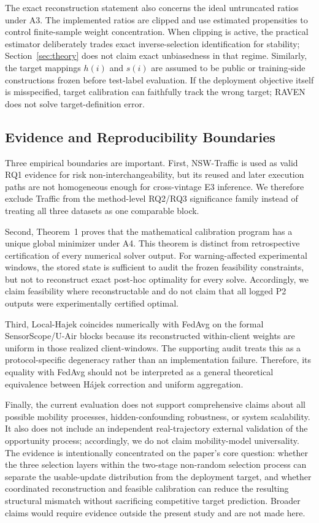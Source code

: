 \documentclass[letterpaper,journal]{IEEEtran}
\begin{document}
The exact reconstruction statement also concerns the ideal untruncated ratios
under A3.  The implemented ratios are clipped and use estimated propensities to
control finite-sample weight concentration.  When clipping is active, the
practical estimator deliberately trades exact inverse-selection identification
for stability; Section~\ref{sec:theory} does not claim exact unbiasedness in
that regime.  Similarly, the target mappings $h(i)$ and $s(i)$ are assumed to
be public or training-side constructions frozen before test-label evaluation.
If the deployment objective itself is misspecified, target calibration can
faithfully track the wrong target; RAVEN does not solve target-definition
error.

\subsection{Evidence and Reproducibility Boundaries}
\label{subsec:discussion_evidence_limits}

Three empirical boundaries are important.  First, NSW-Traffic is used as valid
RQ1 evidence for risk non-interchangeability, but its reused and later execution
paths are not homogeneous enough for cross-vintage E3 inference.  We therefore
exclude Traffic from the method-level RQ2/RQ3 significance family instead of
treating all three datasets as one comparable block.

Second, Theorem~1 proves that the mathematical calibration program has a unique
global minimizer under A4.  This theorem is distinct from retrospective
certification of every numerical solver output.  For warning-affected
experimental windows, the stored state is sufficient to audit the frozen
feasibility constraints, but not to reconstruct exact post-hoc optimality for
every solve.  Accordingly, we claim feasibility where reconstructable and do
not claim that all logged P2 outputs were experimentally certified optimal.

Third, Local-Hajek coincides numerically with FedAvg on the formal
SensorScope/U-Air blocks because its reconstructed within-client weights are
uniform in those realized client-windows.  The supporting audit treats this as
a protocol-specific degeneracy rather than an implementation failure.
Therefore, its equality with FedAvg should not be interpreted as a general
theoretical equivalence between H\'ajek correction and uniform aggregation.

Finally, the current evaluation does not support comprehensive claims about all
possible mobility processes, hidden-confounding robustness, or system
scalability.  It also does not include an independent real-trajectory external
validation of the opportunity process; accordingly, we do not claim
mobility-model universality.  The evidence is intentionally concentrated on the paper's core
question: whether the three selection layers within the two-stage
non-random selection process can separate the usable-update distribution from
the deployment target, and whether coordinated
reconstruction and feasible calibration can reduce the resulting structural
mismatch without sacrificing competitive target prediction.  Broader claims
would require evidence outside the present study and are not made here.
\end{document}

